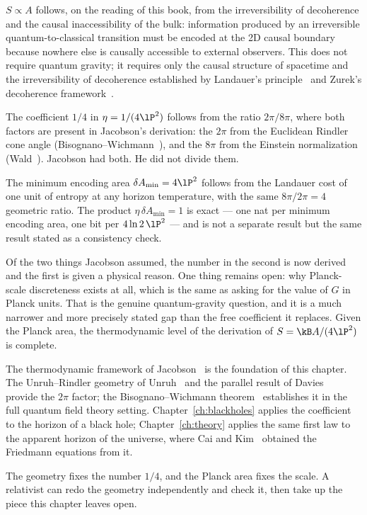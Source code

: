$S\propto A$ follows, on the reading of this book, from the irreversibility of decoherence and the causal inaccessibility of the bulk: information produced
by an irreversible quantum-to-classical transition must be encoded at the 2D causal boundary because nowhere else is causally accessible to external
observers. This does not require quantum gravity; it requires only the causal structure of spacetime and the irreversibility of decoherence established
by Landauer's principle~\cite{Landauer1961} and Zurek's decoherence framework~\cite{Zurek2003}. \interp

The coefficient $1/4$ in $\eta=1/(4\lP^2)$ follows from the ratio $2\pi/8\pi$, where both factors are present in Jacobson's derivation: the $2\pi$ from the
Euclidean Rindler cone angle (Bisognano--Wichmann~\cite{BisognanoWichmann1976}), and the $8\pi$ from the Einstein normalization (Wald~\cite{Wald1984}). Jacobson had both. He did
not divide them. \derived

The minimum encoding area $\delta A_{\min}=4\lP^2$ follows from the Landauer cost of one unit of entropy at any horizon temperature, with the same $8\pi/2\pi=4$
geometric ratio. The product $\eta\,\delta A_{\min}=1$ is exact --- one nat per minimum encoding area, one bit per $4\ln2\,\lP^2$ --- and is not a separate
result but the same result stated as a consistency check. \derived

Of the two things Jacobson assumed, the number in the second is now derived and the first is given a physical reason. One thing remains open: why
Planck-scale discreteness exists at all, which is the same as asking for the value of $G$ in Planck units. That is the genuine quantum-gravity question, and
it is a much narrower and more precisely stated gap than the free coefficient it replaces. Given the Planck area, the thermodynamic level of the derivation
of $S=\kB A/(4\lP^2)$ is complete.

The thermodynamic framework of Jacobson~\cite{Jacobson1995} is the foundation of this chapter. The Unruh--Rindler geometry of Unruh~\cite{Unruh1976} and the parallel result of
Davies~\cite{Davies1975} provide the $2\pi$ factor; the Bisognano--Wichmann theorem~\cite{BisognanoWichmann1976} establishes it in the full quantum field theory setting.
Chapter~\ref{ch:blackholes} applies the coefficient to the horizon of a black hole; Chapter~\ref{ch:theory} applies the same first law to the apparent horizon of the
universe, where Cai and Kim~\cite{CaiKim2005} obtained the Friedmann equations from it.

The geometry fixes the number $1/4$, and the Planck area fixes the scale. A relativist can redo the geometry independently and check it, then take up the piece this chapter leaves open.
